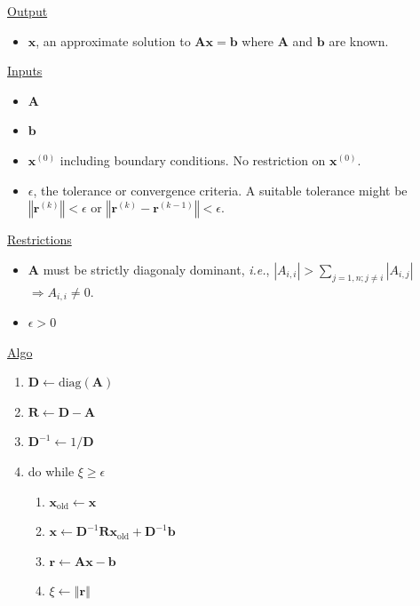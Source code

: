 \begin{algorithm}[h]
\uline{Output}
\begin{itemize}
\item $\bm{x}$, an approximate solution to $\bm{A}\bm{x}=\bm{b}$ where
$\bm{A}$ and $\bm{b}$ are known.
\end{itemize}
\uline{Inputs}
\begin{itemize}
\item $\bm{A}$
\item $\bm{b}$
\item $\bm{x}^{\left(0\right)}$ including boundary conditions. No restriction
on $\bm{x}^{\left(0\right)}$.
\item $\epsilon$, the tolerance or convergence criteria. A suitable tolerance
might be $\left\Vert \bm{r}^{\left(k\right)}\right\Vert <\epsilon$
or $\left\Vert \bm{r}^{\left(k\right)}-\bm{r}^{\left(k-1\right)}\right\Vert <\epsilon$. 
\end{itemize}
\uline{Restrictions}
\begin{itemize}
\item $\bm{A}$ must be strictly diagonaly dominant, \emph{i.e.}, $\left|A_{i,i}\right|>\sum_{j=1,n;j\neq i}\left|A_{i,j}\right|$
$\Rightarrow A_{i,i}\neq0$.
\item $\epsilon>0$
\end{itemize}
\uline{Algo}
\begin{enumerate}
\item $\bm{D}\longleftarrow\mbox{diag}\left(\bm{A}\right)$
\item $\bm{R}\longleftarrow\bm{D}-\bm{A}$
\item $\bm{D}^{-1}\longleftarrow1/\bm{D}$
\item do while $\xi\geq\epsilon$ 

\begin{enumerate}
\item $\bm{x}_{\mathrm{old}}\longleftarrow\bm{x}$
\item $\bm{x}\longleftarrow\bm{D}^{-1}\bm{R}\bm{x}_{\mathrm{old}}+\bm{D}^{-1}\bm{b}$
\item $\bm{r}\longleftarrow\bm{A}\bm{x}-\bm{b}$
\item $\xi\longleftarrow\left\Vert \bm{r}\right\Vert $
\end{enumerate}
\end{enumerate}
\caption{%
Jacobi's algorithm\label{alg:Jacobi's-algorithm}%
}
\end{algorithm}



